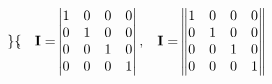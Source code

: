 \documentclass{article}
\begin{document}
\begin{center}
\begin{equation}
\begin{Bmatrix}
        \end{Bmatrix} ,
        \hspace{3mm}
        \mathbf{I =}  
        \begin{vmatrix}
            1 & 0 & 0 & 0 \\
            0 & 1 & 0 & 0 \\
            0 & 0 & 1 & 0 \\
            0 & 0 & 0 & 1 \\
        \end{vmatrix} ,
        \hspace{3mm}
        \mathbf{I =}  
        \begin{Vmatrix}
            1 & 0 & 0 & 0 \\
            0 & 1 & 0 & 0 \\
            0 & 0 & 1 & 0 \\
            0 & 0 & 0 & 1 \\
        \end{Vmatrix}
    \end{equation}   
\end{center}
\end{document}
